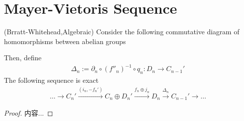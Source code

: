 \documentclass[Total.tex]{subfiles}
\begin{document}
		\section{Mayer-Vietoris Sequence}
		\begin{lemma}
			(Brratt-Whitehead,Algebraic) Consider the following commutative diagram of homomorphisms between abelian groups
			\begin{center}
			\end{center}
			Then, define
			\begin{gather*}
				\Delta_n:=\partial_n\circ (f''_n)^{-1}\circ q_n:D_n\rightarrow C_{n-1}'
			\end{gather*}
			The following sequence is exact
			\begin{gather*}
				\dots\rightarrow C_n'\stackrel{(i_n,-f_n')}{\rightarrow} C_n\oplus D_n'\stackrel{f_n\oplus j_n}{\rightarrow} D_n\stackrel{\Delta_n}{\rightarrow} C_{n-1}'\rightarrow\dots
			\end{gather*}
		\end{lemma}
		\begin{proof}
			内容...
		\end{proof}
\end{document}
